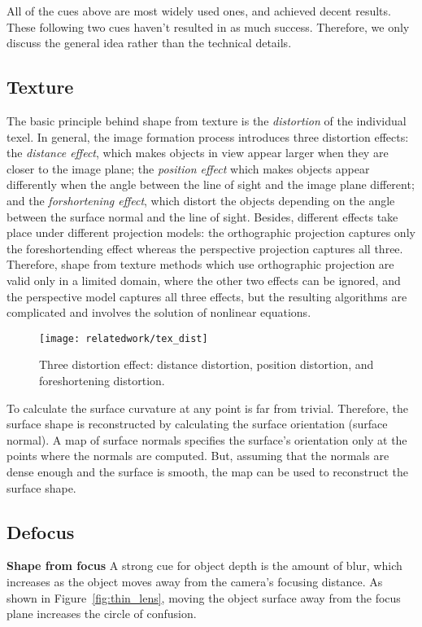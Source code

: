 All of the cues above are most widely used ones, and achieved decent results. These following two cues haven't resulted in as much success. Therefore, we only discuss the general idea rather than the technical details.

\subsection{Texture}
The basic principle behind shape from texture is the \textit{distortion} of the individual texel. In general, the image formation process introduces three distortion effects: the \textit{distance effect}, which makes objects in view appear larger when they are closer to the image plane; the \textit{position effect} which makes objects appear differently when the angle between the line of sight and the image plane different; and the \textit{forshortening effect}, which distort the objects depending on the angle between the surface normal and the line of sight. Besides, different effects take place under different projection models: the orthographic projection captures only the foreshortending effect whereas the perspective projection captures all three. Therefore, shape from texture methods which use orthographic projection are valid only in a limited domain, where the other two effects can be ignored, and the perspective model captures all three effects, but the resulting algorithms are complicated and involves the solution of nonlinear equations.

\begin{figure}[h]
\centering
\texttt{[image: relatedwork/tex\_dist]}
\caption{Three distortion effect: distance distortion, position distortion, and foreshortening distortion.}
\label{fig:tex_dist}
\end{figure}

To calculate the surface curvature at any point is far from trivial. Therefore, the surface shape is reconstructed by calculating the surface orientation (surface normal). A map of surface normals specifies the surface's orientation only at the points where the normals are computed. But, assuming that the normals are dense enough and the surface is smooth, the map can be used to reconstruct the surface shape.

\subsection{Defocus}
\textbf{Shape from focus}
A strong cue for object depth is the amount of blur, which increases as the object moves away from the camera's focusing distance. As shown in Figure~\ref{fig:thin_lens}, moving the object surface away from the focus plane increases the circle of confusion.

